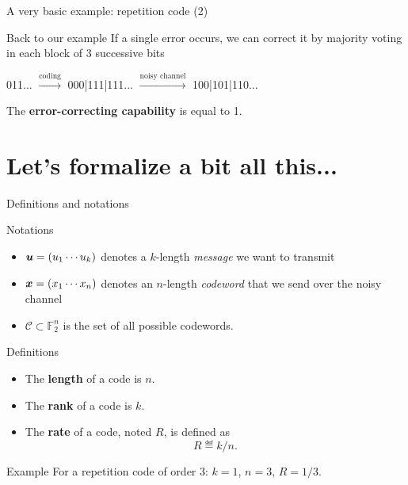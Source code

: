 \documentclass[10pt]{beamer}
\newcommand{\gf}{\mathbb{F}_2}
\begin{document}
\begin{frame}{A very basic example: repetition code (2)}
    \begin{exampleblock}{Back to our example}
        If a single error occurs, we can correct it by majority voting in each block
        of 3 successive bits
        \begin{center}
            011... $\xrightarrow{\text{coding}}$ 000|111|111...
            $\xrightarrow{\text{noisy channel}}$
            {\color{red}1}00|1{\color{red}0}1|11{\color{red}0}...
        \end{center}
        The \textbf{error-correcting capability} is equal to 1.
    \end{exampleblock}
\end{frame}


\section{Let's formalize a bit all this...}
\begin{frame}{Definitions and notations}
    \begin{block}{Notations}
        \begin{itemize}
            \item $\boldsymbol{u} = (u_1\cdots u_k)$ denotes a $k$-length \textit{message} we want to transmit
            \item $\boldsymbol{x} = (x_1\cdots x_n)$ denotes an $n$-length \textit{codeword} that we send over
            the noisy channel
            \item $\mathcal{C} \subset \gf^n$ is the set of all possible codewords.
        \end{itemize}
    \end{block}
    
    \begin{block}{Definitions}
        \begin{itemize}
            \item The \textbf{length} of a code is $n$.
            \item The \textbf{rank} of a code is $k$.
            \item The \textbf{rate} of a code, noted $R$, is defined as
            \[ R \eqdef k/n. \]
        \end{itemize}
    \end{block}

    \begin{exampleblock}{Example}
        For a repetition code of order 3: $k = 1$, $n = 3$, $R = 1/3$.
    \end{exampleblock}
\end{frame}
\end{document}
